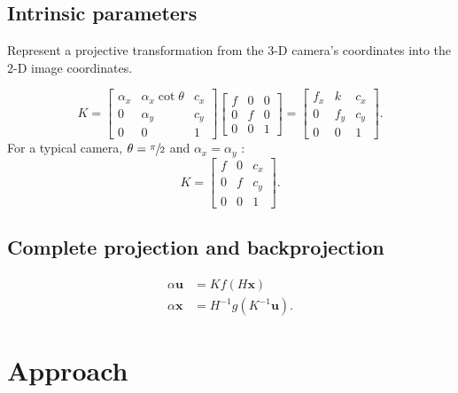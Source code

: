 \documentclass[
  twocolumn,
]{article} %
\begin{document}
\subsection{Intrinsic parameters}
Represent a projective transformation from the 3-D camera’s coordinates into
the 2-D image coordinates.

\begin{equation*}
	K = \begin{bmatrix}
		\alpha_x & \alpha_x \cot \theta & c_x \\
		0        & \alpha_y             & c_y \\
		0        & 0                    & 1
	\end{bmatrix} \begin{bmatrix}
		f & 0 & 0 \\
		0 & f & 0 \\
		0 & 0 & 1
	\end{bmatrix} = \begin{bmatrix}
		f_x & k   & c_x \\
		0   & f_y & c_y \\
		0   & 0   & 1
	\end{bmatrix}.
\end{equation*}
For a typical camera, \(\theta = \sfrac{\pi}{2}\) and \(\alpha_x = \alpha_y\)
\citep{hartleyMultipleViewGeometry2004}:
\begin{equation*}
	K = \begin{bmatrix}
		f & 0 & c_x \\
		0 & f & c_y \\
		0 & 0 & 1
	\end{bmatrix}.
\end{equation*}

\subsection{Complete projection and backprojection}\label{sub:complete_projection_and_backprojection}

\begin{align}
	\alpha \mathbf{u} & = K f(H\mathbf{x})
	\tag{Projection} \label{eq:projection}                     \\
	\alpha \mathbf{x} & = H^{-1} g(K^{-1}\mathbf{u}) \tag{Back
		projection} \label{eq:back_projection}.
\end{align}

\section{Approach}\label{sec:approach}
\end{document}

